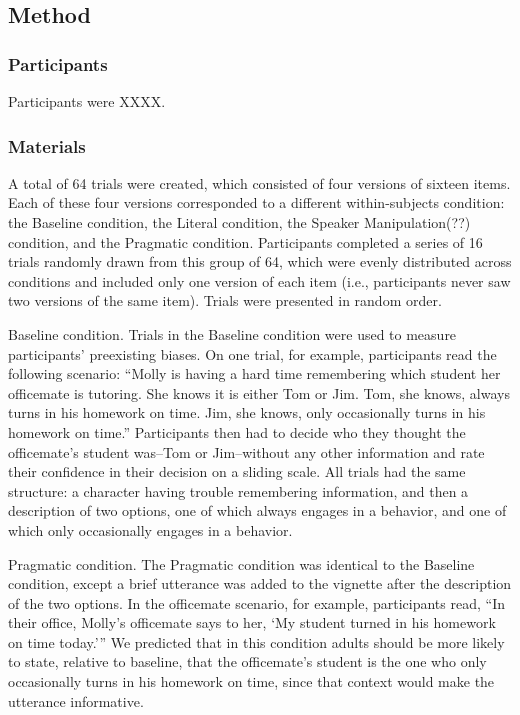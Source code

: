 \documentclass[10pt,letterpaper]{article}
\begin{document}
\subsection{Method}

\subsubsection{Participants}

Participants were XXXX.

\subsubsection{Materials}

A total of 64 trials were created, which consisted of four versions of sixteen items.  Each of these four versions corresponded to a different within-subjects condition: the Baseline condition, the Literal condition, the Speaker Manipulation(??) condition, and the Pragmatic condition.  Participants completed a series of 16 trials randomly drawn from this group of 64, which were evenly distributed across conditions and included only one version of each item (i.e., participants never saw two versions of the same item).  Trials were presented in random order.

Baseline condition. Trials in the Baseline condition were used to measure participants’ preexisting biases.  On one trial, for example, participants read the following scenario: “Molly is having a hard time remembering which student her officemate is tutoring.  She knows it is either Tom or Jim. Tom, she knows, always turns in his homework on time.  Jim, she knows, only occasionally turns in his homework on time.”  Participants then had to decide who they thought the officemate’s student was--Tom or Jim--without any other information and rate their confidence in their decision on a sliding scale.  All trials had the same structure: a character having trouble remembering information, and then a description of two options, one of which always engages in a behavior, and one of which only occasionally engages in a behavior.

Pragmatic condition. The Pragmatic condition was identical to the Baseline condition, except a brief utterance was added to the vignette after the description of the two options.  In the officemate scenario, for example, participants read, “In their office, Molly’s officemate says to her, ‘My student turned in his homework on time today.’”  We predicted that in this condition adults should be more likely to state, relative to baseline, that the officemate’s student is the one who only occasionally turns in his homework on time, since that context would make the utterance informative.
\end{document}
